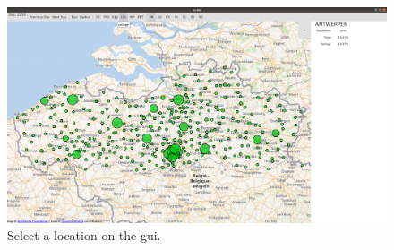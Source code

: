 \begin{figure}[h]
\centering
\includegraphics[width=\textwidth]{locSelect.png}
\caption{Select a location on the gui.}
\label{gui_location}
\end{figure}



 